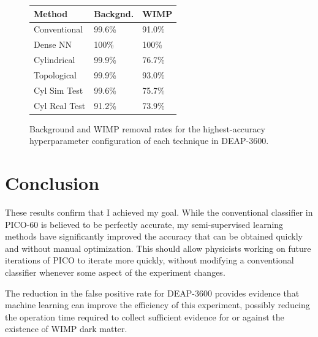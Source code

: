 \documentclass[12pt]{article}
\begin{document}
\begin{figure}[ht]
    \centering
    \qquad
    \begin{tabular}[b]{|l|l|l|}
        \hline
        Method & Backgnd. & WIMP \\
        \hline
        Conventional & 99.6\% & 91.0\% \\
        \hline
        Dense NN & 100\% & 100\% \\
        \hline
        Cylindrical & 99.9\% & 76.7\% \\
        \hline
        Topological & 99.9\% & 93.0\% \\
        \hline
        Cyl Sim Test & 99.6\% & 75.7\% \\
        \hline
        Cyl Real Test & 91.2\% & 73.9\% \\
        \hline
    \end{tabular}
    \caption{\label{deap_final_results} Background and WIMP removal rates for the highest-accuracy hyperparameter configuration of each technique in DEAP-3600.}
\end{figure}

\section{Conclusion}

These results confirm that I achieved my goal. While the conventional classifier in PICO-60 is believed to be perfectly accurate, my semi-supervised learning methods have significantly improved the accuracy that can be obtained quickly and without manual optimization. This should allow physicists working on future iterations of PICO to iterate more quickly, without modifying a conventional classifier whenever some aspect of the experiment changes.

The reduction in the false positive rate for DEAP-3600 provides evidence that machine learning can improve the efficiency of this experiment, possibly reducing the operation time required to collect sufficient evidence for or against the existence of WIMP dark matter.
\end{document}
